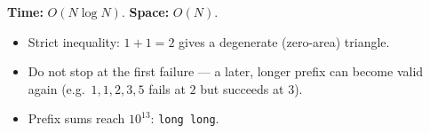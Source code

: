 \begin{complexitybox}
\textbf{Time:} $O(N\log N)$. \textbf{Space:} $O(N)$.
\end{complexitybox}

\begin{pitfallbox}
\begin{itemize}
  \item Strict inequality: $1+1=2$ gives a degenerate (zero-area) triangle.
  \item Do not stop at the first failure --- a later, longer prefix can
        become valid again (e.g.\ $1,1,2,3,5$ fails at $2$ but succeeds at
        $3$).
  \item Prefix sums reach $10^{13}$: \texttt{long long}.
\end{itemize}
\end{pitfallbox}
